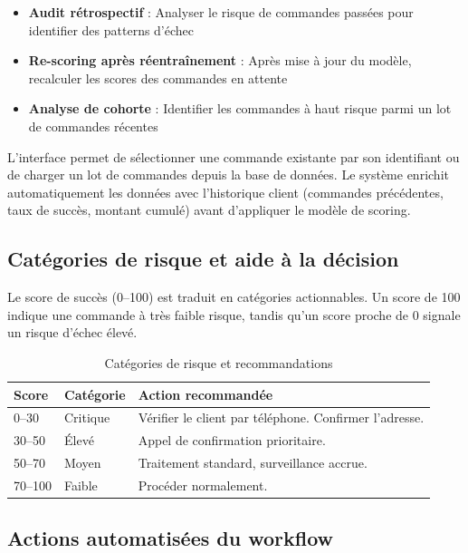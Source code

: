 \documentclass[12pt,a4paper]{report}
\begin{document}
\begin{itemize}
  \item \textbf{Audit r\'{e}trospectif} : Analyser le risque de commandes pass\'{e}es pour identifier des patterns d'\'{e}chec
  \item \textbf{Re-scoring apr\`{e}s r\'{e}entra\^{i}nement} : Apr\`{e}s mise \`{a} jour du mod\`{e}le, recalculer les scores des commandes en attente
  \item \textbf{Analyse de cohorte} : Identifier les commandes \`{a} haut risque parmi un lot de commandes r\'{e}centes
\end{itemize}

L'interface permet de s\'{e}lectionner une commande existante par son identifiant ou de charger un lot de commandes depuis la base de donn\'{e}es. Le syst\`{e}me enrichit automatiquement les donn\'{e}es avec l'historique client (commandes pr\'{e}c\'{e}dentes, taux de succ\`{e}s, montant cumul\'{e}) avant d'appliquer le mod\`{e}le de scoring.

\subsection{Cat\'{e}gories de risque et aide \`{a} la d\'{e}cision}

Le score de succ\`{e}s (0--100) est traduit en cat\'{e}gories actionnables. Un score de 100 indique une commande \`{a} tr\`{e}s faible risque, tandis qu'un score proche de 0 signale un risque d'\'{e}chec \'{e}lev\'{e}.

\begin{table}[H]
\centering
\caption{Cat\'{e}gories de risque et recommandations}
\label{tab:risk_categories}
\begin{tabularx}{\textwidth}{l l X}
\toprule
\textbf{Score} & \textbf{Cat\'{e}gorie} & \textbf{Action recommand\'{e}e} \\
\midrule
0--30 & Critique & V\'{e}rifier le client par t\'{e}l\'{e}phone. Confirmer l'adresse. \\
30--50 & \'{E}lev\'{e} & Appel de confirmation prioritaire. \\
50--70 & Moyen & Traitement standard, surveillance accrue. \\
70--100 & Faible & Proc\'{e}der normalement. \\
\bottomrule
\end{tabularx}
\end{table}

\subsection{Actions automatis\'{e}es du workflow}
\end{document}
